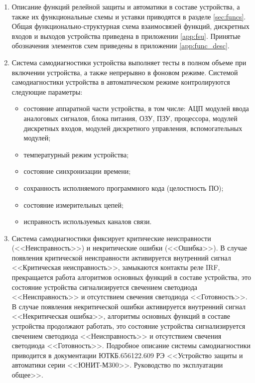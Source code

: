 \documentclass[a4paper, 12pt,table, hidelinks, DIV=calc]{extarticle} %
\begin{document}
\begin{enumerate}[label=\arabic{section}.\arabic{subsection}.\arabic*, labelsep=4pt, leftmargin=0pt, itemindent=57pt]
\item
Описание функций релейной защиты и автоматики в составе устройства, а также их функциональные схемы и уставки приводятся в разделе \ref{sec:funcs}. Общая функционально-структурная схема взаимосвязей функций, дискретных входов и выходов устройства приведена в приложении \ref{app:fsu}. Принятые обозначения элементов схем приведены в приложении \ref{app:func_desc}.
\item
Система самодиагностики устройства выполняет тесты в полном объеме при включении устройства, а также непрерывно в фоновом режиме.
Системой самодиагностики устройства в автоматическом режиме контролируются следующие параметры:
\begin{itemize}
\item состояние аппаратной части устройства, в том числе: АЦП модулей ввода аналоговых сигналов, блока питания, ОЗУ, ПЗУ, процессора, модулей дискретных входов, модулей дискретного управления, вспомогательных модулей;
\item температурный режим устройства;
\item состояние синхронизации времени;
\item сохранность исполняемого программного кода (целостность ПО);
\item состояние измерительных цепей;
\item исправность используемых каналов связи.
\end{itemize}
\item
Система самодиагностики фиксирует критические неисправности (<<Неисправность>>) и некритические ошибки (<<Ошибка>>). В случае появления критической неисправности активируется внутренний сигнал <<Критическая неисправность>>, замыкаются контакты реле IRF, прекращается работа алгоритмов основных функций в составе устройства, это состояние устройства сигнализируется свечением светодиода <<Неисправность>> и отсутствием свечения светодиода <<Готовность>>. В случае появления некритической ошибки активируется внутренний сигнал <<Некритическая ошибка>>, алгоритмы основных функций в составе устройства продолжают работать, это состояние устройства сигнализируется свечением светодиода <<Неисправность>> и отсутствием свечения светодиода <<Готовность>>. Подробное описание системы самодиагностики приводится в документации ЮТКБ.656122.609 РЭ <<Устройство защиты и автоматики серии <<ЮНИТ-М300>>. Руководство по эксплуатации общее>>.


\end{enumerate}
\end{document}
